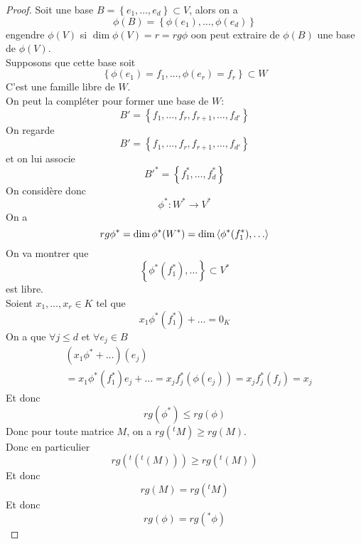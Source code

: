 \documentclass[../main.tex]{subfiles}
\begin{document}
\begin{proof}
Soit une base $B= \left\{ e_1,\ldots, e_d \right\}\subset V $, alors on a
\[ 
	\phi( B) = \left\{ \phi( e_1) ,\ldots, \phi( e_d)  \right\} 
\]
engendre $\phi( V) $ si $\dim \phi( V) = r = rg \phi$ oon peut extraire de $\phi( B) $ une base de $\phi( V) $.\\
Supposons que cette base soit
\[ 
	\left\{ \phi( e_1)=f_1, \ldots , \phi( e_r) = f_r \right\} \subset W
\]
C'est une famille libre de $W$.\\
On peut la compléter pour former une base de $W$:
\[ 
B' = \left\{ f_1,\ldots, f_r,f_{r+1} ,\ldots, f_{d'}  \right\} 
\]
On regarde 
\[ 
B' = \left\{ f_1,\ldots, f_r, f_{r+1} ,\ldots, f_{d'}  \right\} 
\]
et on lui associe
\[ 
B'^{*}= \left\{ f_1^{*}, \ldots, f_d^{*} \right\} 
\]
On considère donc 
\[ 
\phi^{*}: W^{*}\to V^{*}
\]
On a
\[ 
	rg\phi^{*}= \dim \phi^{*}( W^{*}) = \dim \left\langle \phi^{*}( f_1^{*}) , \ldots\right\rangle
\]
	On va montrer que 
	\[ 
		\left\{ \phi^{*}( f_1^{*}) , \ldots \right\} \subset V^{*}
	\]
est libre.\\
Soient $x_1, \ldots, x_r\in K$ tel que
\[ 
	x_1\phi^{*}( f_1^{*}) + \ldots = 0_K
\]
On a que $\forall j \leq d$ et $\forall e_j \in B$
\begin{align*}
&( x_1\phi^{*}+ \ldots) ( e_{j} ) \\
&= x_1 \phi^{*}( f_1^{*}) e_j + \ldots = x_j f_j^{*}( \phi( e_j) ) = x_{j}  f_j^{*}( f_j) = x_{j} 
\end{align*}
Et donc
\[ 
	rg( \phi^{*}) \leq rg( \phi) 
\]
Donc pour toute matrice $M$, on a $rg( ^{t}M) \geq rg( M) $.\\
Donc en particulier
\[ 
	rg( ^{t}( ^{t}( M) ) ) \geq rg( ^{t}( M) ) 
\]
Et donc 
\[ 
	rg( M) = rg( ^{t} M ) 
\]
Et donc
\[ 
	rg( \phi) = rg( ^{*}\phi) 
\]




\end{proof}
\end{document}
